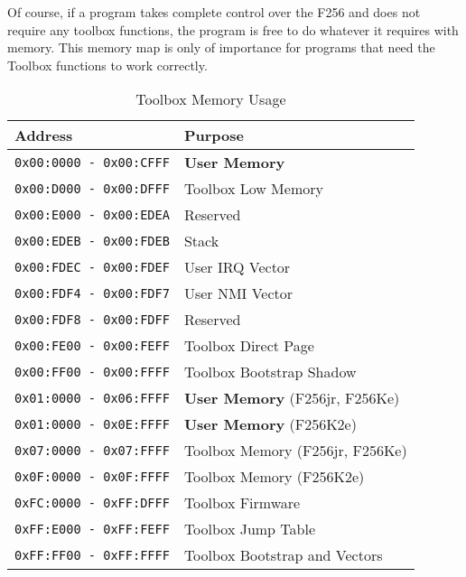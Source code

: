 Of course, if a program takes complete control over the F256 and does not require any toolbox functions, the program is free
to do whatever it requires with memory. This memory map is only of importance for programs that need the Toolbox functions to
work correctly.

\begin{table}
	\begin{center}
		\begin{tabular}{|l|l|} \hline
			Address & Purpose \\ \hline\hline
			{\tt 0x00:0000 - 0x00:CFFF} & {\bf User Memory} \\ \hline
			{\tt 0x00:D000 - 0x00:DFFF} & Toolbox Low Memory \\ \hline
			{\tt 0x00:E000 - 0x00:EDEA} & Reserved \\ \hline
			{\tt 0x00:EDEB - 0x00:FDEB} & Stack \\ \hline
			{\tt 0x00:FDEC - 0x00:FDEF} & User IRQ Vector \\ \hline
			{\tt 0x00:FDF4 - 0x00:FDF7} & User NMI Vector \\ \hline
			{\tt 0x00:FDF8 - 0x00:FDFF} & Reserved \\ \hline
			{\tt 0x00:FE00 - 0x00:FEFF} & Toolbox Direct Page \\ \hline
			{\tt 0x00:FF00 - 0x00:FFFF} & Toolbox Bootstrap Shadow \\ \hline
			{\tt 0x01:0000 - 0x06:FFFF} & {\bf User Memory} (F256jr, F256Ke) \\ \hline	
			{\tt 0x01:0000 - 0x0E:FFFF} & {\bf User Memory} (F256K2e) \\ \hline	
			{\tt 0x07:0000 - 0x07:FFFF} & Toolbox Memory (F256jr, F256Ke) \\ \hline
			{\tt 0x0F:0000 - 0x0F:FFFF} & Toolbox Memory (F256K2e) \\ \hline
			{\tt 0xFC:0000 - 0xFF:DFFF} & Toolbox Firmware \\ \hline
			{\tt 0xFF:E000 - 0xFF:FEFF} & Toolbox Jump Table \\ \hline
			{\tt 0xFF:FF00 - 0xFF:FFFF} & Toolbox Bootstrap and Vectors \\ \hline
		\end{tabular}
	\end{center}
	\caption{Toolbox Memory Usage}
	\label{tbl:memory_map}
\end{table}
